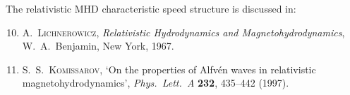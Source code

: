 \noindent
The relativistic MHD characteristic speed structure is discussed in:

\begin{enumerate}\setcounter{enumi}{9}
\item A.~\textsc{Lichnerowicz}, \emph{Relativistic Hydrodynamics and
  Magnetohydrodynamics}, W.~A.~Benjamin, New York, 1967.

\item S.~S.~\textsc{Komissarov}, `On the properties of Alfv\'en
  waves in relativistic magnetohydrodynamics',
  \emph{Phys.\ Lett.\ A} \textbf{232}, 435--442 (1997).
\end{enumerate}
